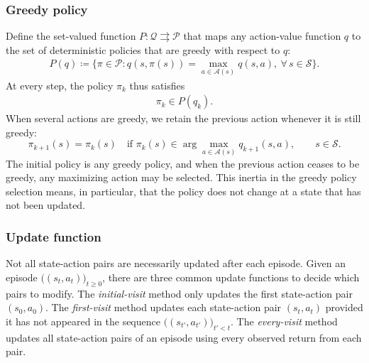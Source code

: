 \documentclass[twoside,11pt]{article}
\newcommand{\qset}{\mathcal{Q}}
\newcommand{\aset}{\mathcal{A}}
\newcommand{\sset}{\mathcal{S}}
\newcommand{\polset}{\mathcal{P}}
\newcommand{\pol}{\pi}
\newcommand{\grpol}{P}
\DeclareRobustCommand{\reviewbarstart}{%
  \ifhmode %
    \vadjust{\vbox to 0pt{%
      \vskip-\ht\strutbox %
      \vskip-\dp\strutbox %
      \cbstart[\changebarwidth] %
      \vss %
    }}%
  \else %
    \cbstart[\changebarwidth]%
  \fi %
} %
\providecommand{\DIFadd}[1]{#1} %
\providecommand{\DIFaddbegin}{\reviewbarstart} %
\providecommand{\DIFaddend}{\protect\cbend} %
\def\DIFadd#1{#1}%
\def\DIFaddbegin{}%
\def\DIFaddend{}%
\begin{document}
\subsubsection{Greedy policy}

Define the set-valued function $\grpol : \qset \rightrightarrows \polset$ that maps any action-value function $q$ to the set of deterministic policies that are greedy with respect to $q$:
\begin{align}
\label{eq: greedy pol}
    \grpol(q) \coloneqq \big\{ \pol \in \polset : q(s, \pol(s)) = \max_{a \in \aset(s)} q(s,a), \ \forall \, s \in \sset \big\} .
\end{align}
At every step, the policy $\pi_k$ thus satisfies
\begin{align}
\label{eq: greedy policy def}
    \pi_k \in \grpol(q_k) .
\end{align}
 \DIFaddbegin \DIFadd{When several actions are greedy, we retain the previous action whenever it is still greedy:
}\begin{equation}
\DIFadd{\label{eq:greedy-pol-tie-breaking}
\pi_{k+1}(s)=\pi_k(s)
\quad\text{if }\pi_k(s)\in\arg\max_{a\in\mathcal A(s)}q_{k+1}(s,a),
\qquad s\in\mathcal S.
}\end{equation}\DIFaddend 
 \DIFaddbegin \DIFadd{The initial policy is any greedy policy, and when the previous action ceases to be greedy, any maximizing action may be selected.
This inertia in the greedy policy selection means, in particular, that the policy does not change at a state that has not been updated}\DIFaddend .

\subsubsection{Update function}

Not all state-action pairs are necessarily updated after each episode.
Given an episode $\big( (s_t, a_t) \big)_{t \ge 0}$, there are three common update functions to decide which pairs to modify.
The \textit{initial-visit} method only updates the first state-action pair $(s_0, a_0)$.
The \textit{first-visit} method updates each state-action pair $(s_t, a_t)$ provided it has not appeared in the sequence $\big((s_{t'}, a_{t'})\big)_{t' < t}$.
The \textit{every-visit} method updates all state-action pairs of an episode using every observed return from each pair.
\end{document}
